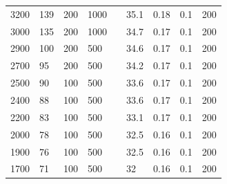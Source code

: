 \documentclass{article}
\begin{document}
\begin{longtable}[c]{|l|l|l|l|l|l|l|l|l|}
    3200          & 139                       & 200                       & 1000                      &  & 35.1       & 0.18                      & 0.1                       & 200                       \\ \cline{1-4} \cline{6-9}
    3000          & 135                       & 200                       & 1000                      &  & 34.7       & 0.17                      & 0.1                       & 200                       \\ \cline{1-4} \cline{6-9}
    2900          & 100                       & 200                       & 500                       &  & 34.6       & 0.17                      & 0.1                       & 200                       \\ \cline{1-4} \cline{6-9}
    2700          & 95                        & 200                       & 500                       &  & 34.2       & 0.17                      & 0.1                       & 200                       \\ \cline{1-4} \cline{6-9}
    2500          & 90                        & 100                       & 500                       &  & 33.6       & 0.17                      & 0.1                       & 200                       \\ \cline{1-4} \cline{6-9}
    2400          & 88                        & 100                       & 500                       &  & 33.6       & 0.17                      & 0.1                       & 200                       \\ \cline{1-4} \cline{6-9}
    2200          & 83                        & 100                       & 500                       &  & 33.1       & 0.17                      & 0.1                       & 200                       \\ \cline{1-4} \cline{6-9}
    2000          & 78                        & 100                       & 500                       &  & 32.5       & 0.16                      & 0.1                       & 200                       \\ \cline{1-4} \cline{6-9}
    1900          & 76                        & 100                       & 500                       &  & 32.5       & 0.16                      & 0.1                       & 200                       \\ \cline{1-4} \cline{6-9}
    1700          & 71                        & 100                       & 500                       &  & 32         & 0.16                      & 0.1                       & 200                       \\ \cline{1-4} \cline{6-9}

\end{longtable}
\end{document}
